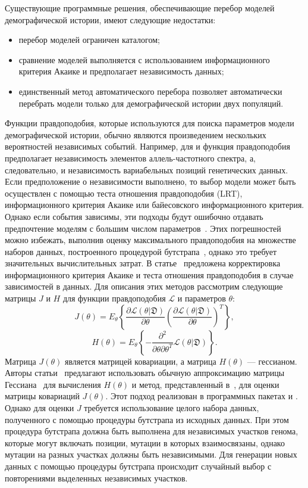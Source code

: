 Существующие программные решения, обеспечивающие перебор моделей демографической истории, имеют следующие недостатки:
\begin{itemize}
    \item перебор моделей ограничен каталогом;
    \item сравнение моделей выполняется с использованием информационного критерия Акаике и предполагает независимость данных;
    \item единственный метод автоматического перебора позволяет автоматически перебрать модели только для демографической истории двух популяций.
\end{itemize}

Функции правдоподобия, которые используются для поиска параметров модели демографической истории, обычно являются произведением нескольких вероятностей независимых событий.
Например, для \dadi и \moments функция правдоподобия предполагает независимость элементов аллель-частотного спектра, а, следовательно, и независимость вариабельных позиций генетических данных.
Если предположение о независимости выполнено, то выбор модели может быть осуществлен с помощью теста отношения правдоподобия (LRT), информационного критерия Акаике или байесовского информационного критерия.
Однако если события зависимы, эти подходы будут ошибочно отдавать предпочтение моделям с большим числом параметров~\cite{gao2010composite}.
Этих погрешностей можно избежать, выполнив оценку максимального правдоподобия на множестве наборов данных, построенного процедурой бутстрапа~\cite{horowitz2001bootstrap}, однако это требует значительных вычислительных затрат.
В статье~\cite{coffman2016computationally} предложена корректировка информационного критерия Акаике и теста отношения правдоподобия в случае зависимостей в данных.
Для описания этих методов рассмотрим следующие матрицы $J$ и $H$ для функции правдоподобия $\mathcal{L}$ и параметров $\theta$:
$$J(\theta)=E_\theta \left\{\frac{\partial \mathcal{L}(\theta|\mathfrak{D})}{\partial \theta} \left( \frac{\partial \mathcal{L}(\theta|\mathfrak{D})}{\partial \theta}\right)^T \right\},$$
$$H(\theta) = E_\theta\left\{ -\frac{\partial^2 }{\partial \theta \partial \theta^T} \mathcal{L}(\theta|\mathfrak{D})\right\}.$$
Матрица $J(\theta)$ является матрицей ковариации, а матрица $H(\theta)$ --- гессианом.
Авторы статьи~\cite{coffman2016computationally} предлагают использовать обычную аппроксимацию матрицы Гессиана~\cite{efron1978assessing} для вычисления $H(\theta)$ и метод, представленный в~\cite{cattelan2016empirical}, для оценки матрицы ковариаций $J(\theta)$.
Этот подход реализован в программных пакетах \dadi и \moments.
Однако для оценки $J$ требуется использование целого набора данных, полученного с помощью процедуры бутстрапа из исходных данных.
При этом процедура бутстрапа должна быть выполнена для независимых участков генома, которые могут включать позиции, мутации в которых взаимосвязаны, однако мутации на разных участках должны быть независимыми.
Для генерации новых данных с помощью процедуры бутстрапа происходит случайный выбор с повторениями выделенных независимых участков.

